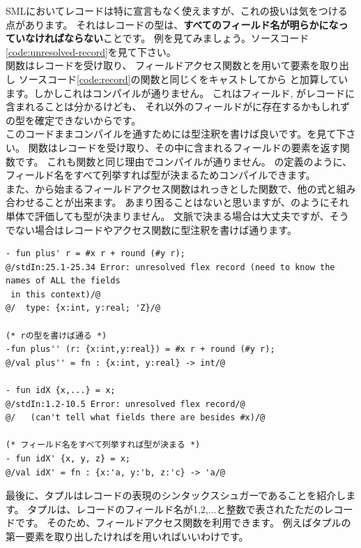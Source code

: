 \documentclass[11pt,a4paper]{jarticle}
\begin{document}
SMLにおいてレコードは特に宣言もなく使えますが、これの扱いは気をつける点があります。
それはレコードの型は、\textbf{すべてのフィールド名が明らかになっていなければならない}ことです。
例を見てみましょう。ソースコード\ref{code:unresolved-record}を見て下さい。\\
関数はレコードを受け取り、
フィールドアクセス関数とを用いて要素を取り出し
ソースコード\ref{code:record}の関数と同じくをキャストしてから
と加算しています。しかしこれはコンパイルが通りません。
これはフィールド, がレコードに含まれることは分かるけども、
それ以外のフィールドがに存在するかもしれずの型を確定できないからです。\\
このコードままコンパイルを通すためには型注釈を書けば良いです。を見て下さい。
関数はレコードを受け取り、その中に含まれるフィールドの要素を返す関数です。
これも関数と同じ理由でコンパイルが通りません。
の定義のように、フィールド名をすべて列挙すれば型が決まるためコンパイルできます。\\
また、\prog{#}から始まるフィールドアクセス関数はれっきとした関数で、他の式と組み合わせることが出来ます。
あまり困ることはないと思いますが、のようにそれ単体で評価しても型が決まりません。
文脈で決まる場合は大丈夫ですが、そうでない場合はレコードやアクセス関数に型注釈を書けば通ります。

\begin{lstlisting}[caption=フィールド名が解決出来ない例,label=code:unresolved-record]
- fun plus' r = #x r + round (#y r);
@/stdIn:25.1-25.34 Error: unresolved flex record (need to know the names of ALL the fields
 in this context)/@
@/  type: {x:int, y:real; 'Z}/@

(* rの型を書けば通る *)
-fun plus'' (r: {x:int,y:real}) = #x r + round (#y r);
@/val plus'' = fn : {x:int, y:real} -> int/@

- fun idX {x,...} = x;
@/stdIn:1.2-10.5 Error: unresolved flex record/@
@/   (can't tell what fields there are besides #x)/@

(* フィールド名をすべて列挙すれば型が決まる *)
- fun idX' {x, y, z} = x;
@/val idX' = fn : {x:'a, y:'b, z:'c} -> 'a/@
\end{lstlisting}

最後に、タプルはレコードの表現のシンタックスシュガーであることを紹介します。
タプルは、レコードのフィールド名が1,2,...と整数で表されたただのレコードです。
そのため、フィールドアクセス関数を利用できます。
例えばタプルの第一要素を取り出したければを用いればいいわけです。
\end{document}
